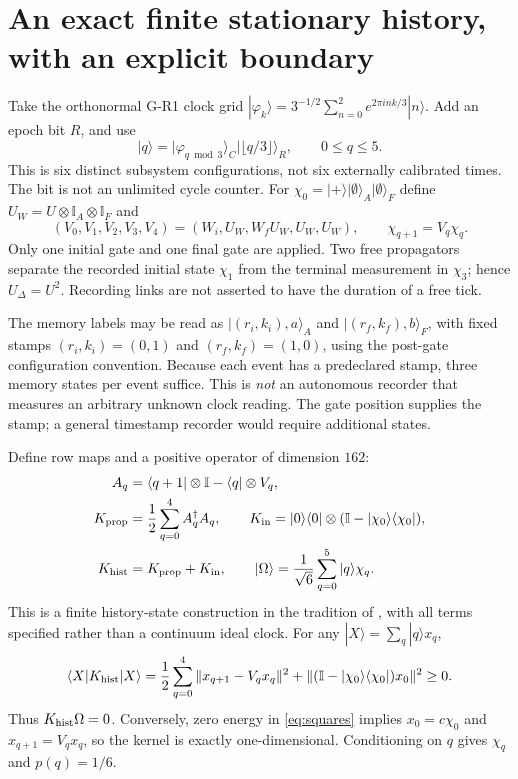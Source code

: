 \documentclass[11pt,a4paper]{article}
\newcommand{\id}{\mathbb I}
\newcommand{\ket}[1]{|#1\rangle}
\newcommand{\bra}[1]{\langle#1|}
\newcommand{\pr}[1]{\ket{#1}\bra{#1}}
\begin{document}
\newpage
\section{An exact finite stationary history, with an explicit boundary}
Take the orthonormal G-R1 clock grid
$\ket{\varphi_k}=3^{-1/2}\sum_{n=0}^2e^{2\pi i nk/3}\ket n$.
Add an epoch bit $R$, and use
\begin{equation}
 \ket q=\ket{\varphi_{q\bmod3}}_C
       \ket{\lfloor q/3\rfloor}_R,\qquad 0\leq q\leq5.
\end{equation}
This is six distinct subsystem configurations, not six externally
calibrated times. The bit is not an unlimited cycle counter.
For $\chi_0=\ket+\ket\emptyset_A\ket\emptyset_F$ define
$U_W=U\otimes\id_A\otimes\id_F$ and
\begin{equation}\label{eq:links}
 (V_0,V_1,V_2,V_3,V_4)=(W_i,U_W,W_fU_W,U_W,U_W),
 \qquad \chi_{q+1}=V_q\chi_q .
\end{equation}
Only one initial gate and one final gate are applied. Two free
propagators separate the recorded initial state $\chi_1$ from
the terminal measurement in $\chi_3$; hence $U_\Delta=U^2$.
Recording links are not asserted to have the duration of a free tick.

The memory labels may be read as $\ket{(r_i,k_i),a}_A$ and
$\ket{(r_f,k_f),b}_F$, with fixed stamps $(r_i,k_i)=(0,1)$ and
$(r_f,k_f)=(1,0)$, using the post-gate configuration convention.
Because each event has a predeclared stamp, three memory states per
event suffice. This is \emph{not} an autonomous recorder that measures
an arbitrary unknown clock reading. The gate position supplies the
stamp; a general timestamp recorder would require additional states.

Define row maps and a positive operator of dimension $162$:
\begin{align}
 A_q&=\bra{q+1}\otimes\id-\bra q\otimes V_q,\\
 K_{\rm prop}&=\frac12\sum_{q=0}^4 A_q^\dagger A_q,\qquad
 K_{\rm in}=\pr0\otimes(\id-\pr{\chi_0}),\\
 K_{\rm hist}&=K_{\rm prop}+K_{\rm in},\qquad
 \ket\Omega=\frac1{\sqrt6}\sum_{q=0}^5\ket q\chi_q .
\end{align}
This is a finite history-state construction in the tradition of
\cite{history}, with all terms specified rather than a continuum ideal
clock. For any $\ket X=\sum_q\ket q x_q$,
\begin{equation}\label{eq:squares}
 \bra X K_{\rm hist}\ket X
 =\frac12\sum_{q=0}^4\|x_{q+1}-V_qx_q\|^2
  +\|(\id-\pr{\chi_0})x_0\|^2\geq0 .
\end{equation}
Thus $K_{\rm hist}\Omega=0$. Conversely, zero energy in
\eqref{eq:squares} implies $x_0=c\chi_0$ and $x_{q+1}=V_qx_q$,
so the kernel is exactly one-dimensional.
Conditioning on $q$ gives $\chi_q$ and $p(q)=1/6$.
\end{document}
